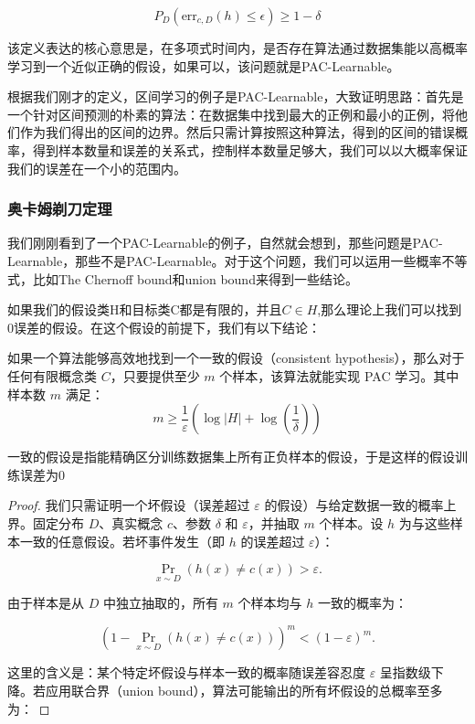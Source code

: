 \documentclass[lang=cn,newtx,10pt,scheme=chinese,chinesefont=nofont,citestyle=gb7714-2015, bibstyle=gb7714-2015]{elegantbook}
\begin{document}
\begin{refsection}
\begin{definition}
    \[
    P_D(\text{err}_{c,D}(h) \leq \epsilon) \geq 1 - \delta
    \]
\end{definition}
 该定义表达的核心意思是，在多项式时间内，是否存在算法通过数据集能以高概率学习到一个近似正确的假设，如果可以，该问题就是PAC-Learnable。
 
 根据我们刚才的定义，区间学习的例子是PAC-Learnable，大致证明思路：首先是一个针对区间预测的朴素的算法：在数据集中找到最大的正例和最小的正例，将他们作为我们得出的区间的边界。然后只需计算按照这种算法，得到的区间的错误概率，得到样本数量和误差的关系式，控制样本数量足够大，我们可以以大概率保证我们的误差在一个小的范围内。
 \subsubsection{奥卡姆剃刀定理}
 我们刚刚看到了一个PAC-Learnable的例子，自然就会想到，那些问题是PAC-Learnable，那些不是PAC-Learnable。对于这个问题，我们可以运用一些概率不等式，比如The Chernoff bound和union bound来得到一些结论。
 
如果我们的假设类H和目标类C都是有限的，并且$C \in H$,那么理论上我们可以找到0误差的假设。在这个假设的前提下，我们有以下结论：
\begin{theorem}
如果一个算法能够高效地找到一个一致的假设（consistent hypothesis），那么对于任何有限概念类 \( C \)，只要提供至少 \( m \) 个样本，该算法就能实现 PAC 学习。其中样本数 \( m \) 满足：
\[
m \geq \frac{1}{\varepsilon} \left( \log |H| + \log \left( \frac{1}{\delta} \right) \right)
\]
\end{theorem}
\begin{remark}
一致的假设是指能精确区分训练数据集上所有正负样本的假设，于是这样的假设训练误差为0
\end{remark}
\begin{proof}
    我们只需证明一个坏假设（误差超过 \(\varepsilon\) 的假设）与给定数据一致的概率上界。固定分布 \(D\)、真实概念 \(c\)、参数 \(\delta\) 和 \(\varepsilon\)，并抽取 \(m\) 个样本。设 \(h\) 为与这些样本一致的任意假设。若坏事件发生（即 \(h\) 的误差超过 \(\varepsilon\)）：

    \[
    \Pr_{x \sim D}(h(x) \neq c(x)) > \varepsilon.
    \]

    由于样本是从 \(D\) 中独立抽取的，所有 \(m\) 个样本均与 \(h\) 一致的概率为：

    \[
    (1 - \Pr_{x \sim D}(h(x) \neq c(x)))^m < (1 - \varepsilon)^m.
    \]

    这里的含义是：某个特定坏假设与样本一致的概率随误差容忍度 \(\varepsilon\) 呈指数级下降。若应用联合界（union bound），算法可能输出的所有坏假设的总概率至多为：


\end{proof}
\end{refsection}
\end{document}
